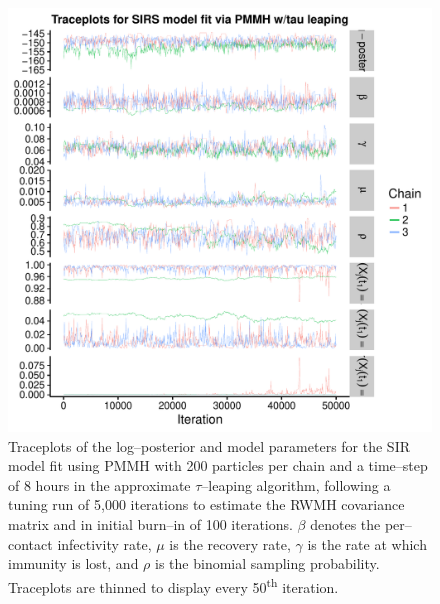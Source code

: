 \begin{figure}[htbp]
	\centering
	\includegraphics[width=0.9\linewidth]{figures/sirs_pomp_approx_traceplots_np200}
	\caption[Simulation 1 MCMC traceplots for an SIRS model fit using PMMH with exact particle paths with 200 particles per chain.]{Traceplots of the log--posterior and model parameters for the SIR model fit using PMMH with 200 particles per chain and a time--step of 8 hours in the approximate $ \tau $--leaping algorithm, following a tuning run of 5,000 iterations to estimate the RWMH covariance matrix and in initial burn--in of 100 iterations. $ \beta $ denotes the per--contact infectivity rate, $ \mu $ is the recovery rate, $\gamma$ is the rate at which immunity is lost, and $ \rho $ is the binomial sampling probability. Traceplots are thinned to display every 50\textsuperscript{th} iteration.}
	\label{fig:sirspompapproxtraceplotsnp200}
\end{figure}

\newpage
